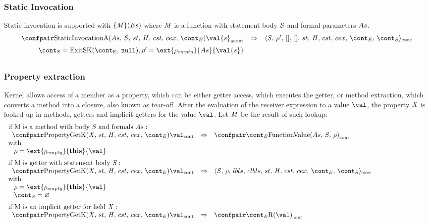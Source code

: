 \documentclass{article}
\renewcommand{\emptyset}{\varnothing}
\begin{document}
\subsubsection{Static Invocation}
Static invocation is supported with $\{\mathit{M}\}(\mathit{E}{s})$ where $\mathit{M}$ is a function with statement body $\mathit{S}$ and formal parameters $As$.
\[
  \begin{array}{rcl}
	\cesktrans{
		\acontconf{\StaticInvA{\formals}{\stmt}{\strace}{\econt}}{\val{s}}}{
		\execconf{\stmt}{\env'}{[]}{[]}{\handler}{\cstrace}{\cex}{\econt}{\scont}}
	\\[2mm]
	\scont = \ExitSK{\tt{null}},
	\env' = \ext{\env_{empty}}{\formals}{\val{s}}\\[2mm]
  \end{array}
\]
\subsubsection{Property extraction}
\label{subsubsec:property-extraction}
Kernel allows access of a member as a property, which can be either getter access, which executes the getter, or method extraction, which converts a method into a closure, also known as tear-off.
\noindent
After the evaluation of the receiver expression to a value $\val$, the property $\mathit{X}$ is looked up in methods, getters and implicit getters for the value $\val$.
Let $\mathit{M}$ be the result of such lookup.
\[
  \begin{array}{lcl@{\hspace{30mm}}}
	\textrm{if M is a method with body }\stmt\textrm{ and formals }\formals :\\
	\hspace{2mm}
	\cesktrans{
		\contconf{\PropertyGetK}{\val}}{
		\contconf{\econt}{\funval{\formals}{\stmt}{\env}}}\\
	\textrm{with}\\
	\hspace{3mm}
	\env = \ext{\env_{empty}}{\mathbf{this}}{\val}\\[2mm]

	\textrm{if M is getter with statement body }\stmt :\\
	\hspace{2mm}
	\cesktrans{
		\contconf{\PropertyGetK}{\val}}{
		\execconf{\stmt}{\env}{\lbls}{\clbls}{\handler}{\cstrace}{\cex}{\econt}{\scont}
		}\\
	\textrm{with}\\
	\hspace{3mm}
	\env = \ext{\env_{empty}}{\mathbf{this}}{\val}\\
	\hspace{3mm}
	\scont = \emptyset\\[2mm]

	\textrm{if M is an implicit getter for field }\idmeta :\\
	\hspace{2mm}
	\cesktrans{
		\contconf{\PropertyGetK}{\val}}{
		\contconf{\econt}{\textrm{R}(\val)}}
  \end{array}
\]
\end{document}
